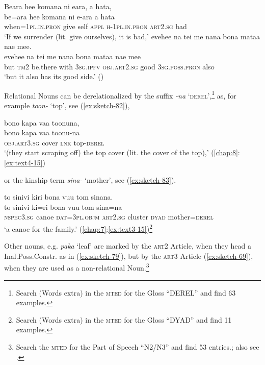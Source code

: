 \documentclass[output=paper]{langscibook}
\begin{document}
\ea\label{ex:sketch-81}
    \ea\label{ex:sketch-81a}
        Beara hee komana ni eara, a hata,\\
        \gll be=ara hee komana ni e-ara a hata\\
        when=1\textsc{pl}.\textsc{in}.\textsc{pron} give self \textsc{appl} \textsc{h}-1\textsc{pl}.\textsc{in}.\textsc{pron}	\textsc{art}2.\textsc{sg} bad\\
        \glt `If we surrender (lit. give ourselves), it is bad,'
    \ex\label{ex:sketch-81b}
        evehee na tei me nana bona mataa nae mee.\\
        \gll evehee na tei me nana bona mataa nae mee\\
        but \textsc{tm}2 be.there with 3\textsc{sg}.\textsc{ipfv} \textsc{obj}.\textsc{art}2.\textsc{sg} good		3\textsc{sg}.\textsc{poss}.\textsc{pron} also\\
        \glt `but it also has its good side.' (\cite[105]{Mahaka:2014oc})
    \z
\z

Relational Nouns can be derelationalized by the suffix \textit{-na} `\textsc{derel}',\footnote{Search (Words extra) in the \textsc{mted} for the Gloss  ``DEREL'' and find 63 examples.} as, for example \textit{toon-} `top', see (\ref{ex:sketch-82}),

\ea\label{ex:sketch-82}
    bono kapa vaa toonuna,\\
    \gll bono	kapa	vaa	toonu-na\\
    \textsc{obj}.\textsc{art}3.\textsc{sg}	cover	\textsc{lnk}	top-\textsc{derel}\\
    \glt `(they start scraping off) the top cover (lit. the cover of the top),' (\ref{chap:8}:\ref{ex:text4-15})
\z

\noindent or the kinship term \textit{sina-} `mother', see (\ref{ex:sketch-83}).

\ea\label{ex:sketch-83}
    to sinivi kiri bona vuu tom sinana.\\
    \gll to	sinivi	ki=ri	bona	vuu	tom	sina=na\\
    \textsc{nspec}3.\textsc{sg}	canoe	\textsc{dat}=3\textsc{pl}.\textsc{objm}	\textsc{art}2.\textsc{sg}	cluster	\textsc{dyad}	mother=\textsc{derel}\\
    \glt `a canoe for the family.' (\ref{chap:7}:\ref{ex:text3-15})\footnote{Search (Words extra) in the \textsc{mted} for the Gloss  ``DYAD'' and find 11 examples.}
\z

Other nouns, e.g. \textit{paka} `leaf' are marked by the \textsc{art}2 Article, when they head a Inal.Poss.Constr. as in (\ref{ex:sketch-79}), but by the \textsc{art}3 Article (\ref{ex:sketch-69}), when they are used as a non-relational Noun.\footnote{Search the \textsc{mted} for the Part of Speech ``N2/N3'' and find 53 entries.; also see \textcite[59--64]{Mosel:2014kg}.} 
\end{document}
